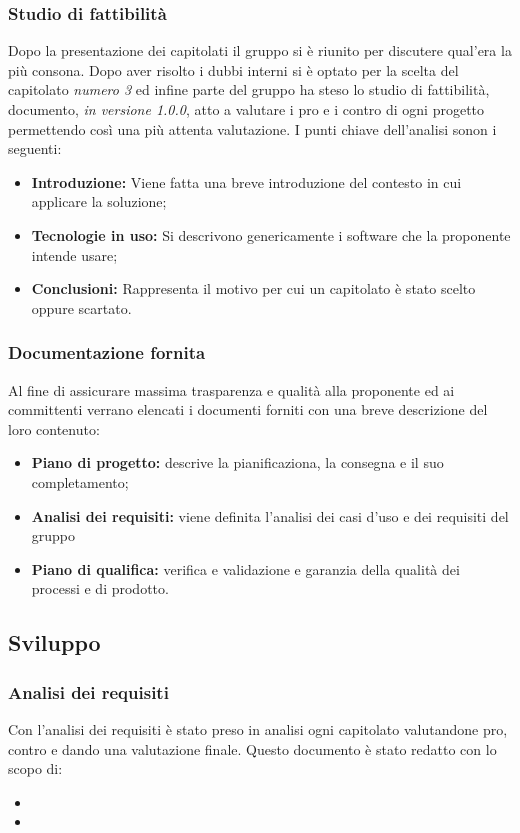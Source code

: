 \documentclass[a4paper,12pt]{article}
\begin{document}
\subsubsection{Studio di fattibilità}
Dopo la presentazione dei capitolati il gruppo si è riunito per discutere qual'era la più consona. Dopo aver risolto i dubbi interni si è optato per la scelta del capitolato \textit{numero 3} ed infine parte del gruppo ha steso lo studio di fattibilità, documento, \textit{in versione 1.0.0},  atto a valutare i pro e i contro di ogni progetto permettendo così una più attenta valutazione. \newline
I punti chiave dell'analisi sonon i seguenti:
\begin{itemize}
	\item \textbf{Introduzione:} Viene fatta una breve introduzione del contesto in cui applicare la soluzione; 
	\item \textbf{Tecnologie in uso:} Si descrivono genericamente i software che la proponente intende usare;
	\item \textbf{Conclusioni:} Rappresenta il motivo per cui un capitolato è stato scelto oppure scartato.
\end{itemize}
\subsubsection{Documentazione fornita}
Al fine di assicurare massima trasparenza e qualità alla proponente ed ai committenti verrano elencati i documenti forniti con una breve descrizione del loro contenuto:
\begin{itemize}
\item \textbf{Piano di progetto:} descrive la pianificaziona, la consegna e il suo completamento;
\item \textbf{Analisi dei requisiti:} viene definita l'analisi dei casi d'uso e dei requisiti del gruppo
\item \textbf{Piano di qualifica:} verifica e validazione e garanzia della qualità dei processi e di prodotto.
\end{itemize}
 
\subsection{Sviluppo}
\subsubsection{Analisi dei requisiti}
Con l'analisi dei requisiti è stato preso in analisi ogni capitolato valutandone pro, contro e dando una valutazione finale. Questo documento è stato redatto con lo scopo di:
\begin{itemize}
\item 
\item 
\end{itemize}
\end{document}
